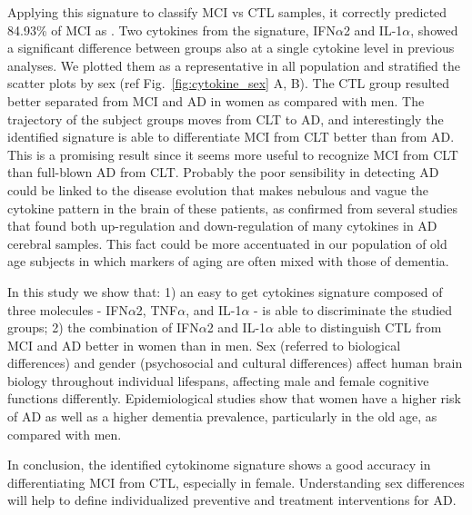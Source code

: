 \documentclass{standalone}
\begin{document}
Applying this signature to classify MCI vs CTL samples, it correctly predicted 84.93\% of MCI as .
Two cytokines from the signature, IFN$\alpha$2 and IL-1$\alpha$, showed a significant difference between groups also at a single cytokine level in previous analyses.
We plotted them as a representative in all population and stratified the scatter plots by sex (ref Fig.~\ref{fig:cytokine_sex} A, B).
The CTL group resulted better separated from MCI and AD in women as compared with men.
The trajectory of the subject groups moves from CLT to AD, and interestingly the identified signature is able to differentiate MCI from CLT better than from AD.
This is a promising result since it seems more useful to recognize MCI from CLT than full-blown AD from CLT.
Probably the poor sensibility in detecting AD could be linked to the disease evolution that makes nebulous and vague the cytokine pattern in the brain of these patients, as confirmed from several studies that found both up-regulation and down-regulation of many cytokines in AD cerebral samples.
This fact could be more accentuated in our population of old age subjects in which markers of aging are often mixed with those of dementia.

In this study we show that: 1) an easy to get cytokines signature composed of three molecules - IFN$\alpha$2, TNF$\alpha$, and IL-1$\alpha$ - is able to discriminate the studied groups;  2) the combination of IFN$\alpha$2 and IL-1$\alpha$ able to distinguish CTL from  MCI and AD better in women than in men.
Sex (referred to biological differences) and gender (psychosocial and cultural differences) affect human brain biology throughout individual lifespans, affecting male and female cognitive functions differently.
Epidemiological studies show that women have a higher risk of AD as well as a higher dementia prevalence, particularly in the old age, as compared with men.

In conclusion, the identified cytokinome signature shows a good accuracy in differentiating MCI from CTL, especially in female.
Understanding sex differences will help to define individualized preventive and treatment interventions for AD.
\end{document}
